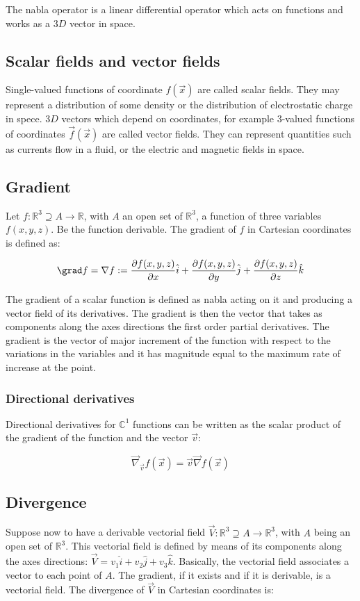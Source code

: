	The nabla operator is a linear differential operator which acts on functions and works as a $3D$ vector in space.

	\subsection{Scalar fields and vector fields}
	Single-valued functions of coordinate $f(\vec{x})$ are called scalar fields.
	They may represent a distribution of some density or the distribution of electrostatic charge in spece.
	$3D$ vectors which depend on coordinates, for example $3$-valued functions of coordinates $\vec{f}(\vec{x})$ are called vector fields.
	They can represent quantities such as currents flow in a fluid, or the electric and magnetic fields in space.

	\subsection{Gradient}
	Let $f:\mathbb{R}^3\supseteq A\rightarrow\mathbb{R}$, with $A$ an open set of $\mathbb{R}^3$, a function of three variables $f(x,y,z)$.
	Be the function derivable.
	The gradient of $f$ in Cartesian coordinates is defined as:

	$$\grad f = \nabla f := \frac{\partial f(x,y,z)}{\partial x}\hat{i} + 
							\frac{\partial f(x,y,z)}{\partial y}\hat{j} + 
							\frac{\partial f(x,y,z)}{\partial z}\hat{k}$$

	The gradient of a scalar function is defined as nabla acting on it and producing a vector field of its derivatives.
	The gradient is then the vector that takes as components along the axes directions the first order partial derivatives.
	The gradient is the vector of major increment of the function with respect to the variations in the variables and it has magnitude equal to the maximum rate of increase at the point.

		\subsubsection{Directional derivatives}
		Directional derivatives for $\mathbb{C}^1$ functions can be written as the scalar product of the gradient of the function and the vector $\vec{v}$:

		$$\vec{\nabla}_{\vec{v}}f(\vec{x}) = \vec{v}\vec{\nabla}f(\vec{x})$$

	\subsection{Divergence}
	Suppose now to have a derivable vectorial field $\vec{V}:\mathbb{R}^3\supseteq A \rightarrow\mathbb{R}^3$, with $A$ being an open set of $\mathbb{R}^3$.
	This vectorial field is defined by means of its components along the axes directions: $\vec{V} = v_1\hat{i} + v_2\hat{j} + v_3\hat{k}$.
	Basically, the vectorial field associates a vector to each point of $A$.
	The gradient, if it exists and if it is derivable, is a vectorial field.
	The divergence of $\vec{V}$ in Cartesian coordinates is:

